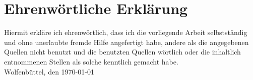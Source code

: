 \clearpage
\thispagestyle{empty}

\section*{Ehrenwörtliche Erklärung}

Hiermit erkläre ich ehrenwörtlich, dass ich die vorliegende Arbeit selbstständig und ohne unerlaubte fremde Hilfe angefertigt habe, andere als die angegebenen Quellen nicht benutzt und die  benutzten Quellen wörtlich oder die inhaltlich entnommenen Stellen als solche kenntlich gemacht habe.
\vspace{4em}\\
Wolfenbüttel, den \today
